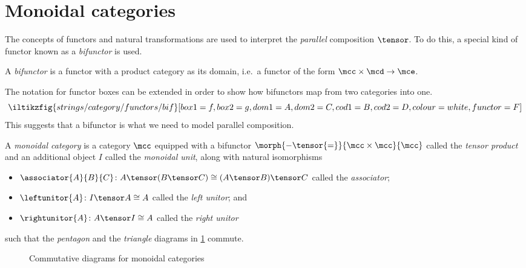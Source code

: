 \section{Monoidal categories}

The concepts of functors and natural transformations are used to interpret
the \emph{parallel} composition \(\tensor\).
To do this, a special kind of functor known as a \emph{bifunctor} is used.

\begin{definition}[Bifunctor]
    A \emph{bifunctor} is a functor with a product category as its domain, i.e.\
    a functor of the form \(\mcc \times \mcd \to \mce\).
\end{definition}

The notation for functor boxes can be extended in order to show how bifunctors
map from two categories into one.
\[
    \iltikzfig{strings/category/functors/bif}[box1=f,box2=g,dom1=A,dom2=C,cod1=B,cod2=D,colour=white,functor=F]
\]
This suggests that a bifunctor is what we need to model
parallel composition.

\begin{definition}
    \label{def:monoidal-category}
    A \emph{monoidal category} is a category \(\mcc\) equipped with a
    bifunctor \(\morph{{-} \tensor {=}}{\mcc \times \mcc}{\mcc}\) called the
    \emph{tensor product} and an additional object \(I\) called the
    \emph{monoidal unit},
    along with natural isomorphisms
    \begin{itemize}
        \item \(
              \associator{A}{B}{C}
              \colon
              A \tensor (B \tensor C)
              \cong
              (A \tensor B) \tensor C
              \) called the \emph{associator};
        \item \(
              \leftunitor{A}
              \colon
              I \tensor A
              \cong
              A
              \) called the \emph{left unitor}; and
        \item \(
              \rightunitor{A}
              \colon
              A \tensor I
              \cong
              A
              \) called the \emph{right unitor}
    \end{itemize}
    such that the \emph{pentagon} and the \emph{triangle} diagrams in
    \cref{fig:mc-diagrams} commute.
\end{definition}

\begin{figure}
    \centering
    

    \vspace{1em}

    
    \caption{Commutative diagrams for monoidal categories}
    \label{fig:mc-diagrams}
\end{figure}

